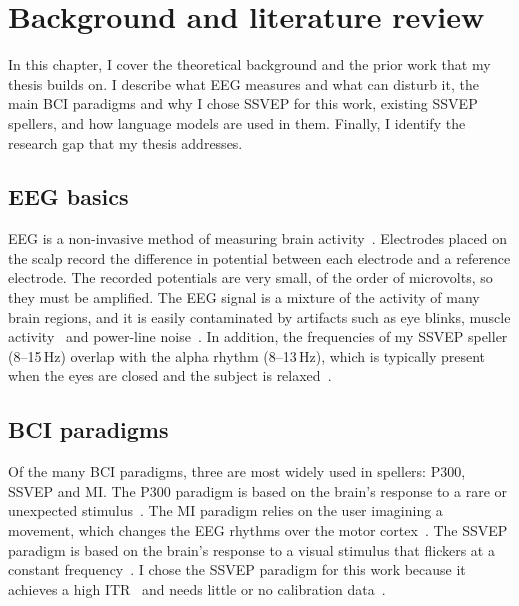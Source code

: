 
\chapter{Background and literature review}
\label{ch:background}

In this chapter, I cover the theoretical background and the prior work that my thesis
builds on. I describe what \ac{EEG} measures and what can disturb it, the main \ac{BCI}
paradigms and why I chose \ac{SSVEP} for this work, existing \ac{SSVEP} spellers, and how
language models are used in them. Finally, I identify the research gap that my thesis
addresses.

\section{EEG basics}
\label{sec:eeg}

\ac{EEG} is a non-invasive method of measuring brain activity~\citep{nunez2006electric}.
Electrodes placed on the scalp record the difference in potential between each electrode
and a reference electrode. The recorded potentials are very small, of the order of
microvolts, so they must be amplified. The \ac{EEG} signal is a mixture of the activity of
many brain regions, and it is easily contaminated by artifacts such as eye blinks, muscle
activity~\citep{goncharova2003emg} and power-line noise~\citep{wang2017benchmark}.
In addition, the frequencies of my \ac{SSVEP} speller (8--15\,Hz) overlap with the alpha
rhythm (8--13\,Hz), which is typically present when the eyes are closed and the subject is
relaxed~\citep{nunez2006electric}.

\section{BCI paradigms}
\label{sec:paradigms}

Of the many \ac{BCI} paradigms, three are most widely used in spellers: P300,
\ac{SSVEP} and \ac{MI}. The P300 paradigm is based on
the brain's response to a rare or unexpected stimulus~\citep{farwell1988talking}. The
\ac{MI} paradigm relies on the user imagining a movement, which changes the \ac{EEG}
rhythms over the motor cortex~\citep{pfurtscheller2001motor}. The \ac{SSVEP} paradigm is
based on the brain's response to a visual stimulus that flickers at a constant
frequency~\citep{chen2015fbcca}. I chose the \ac{SSVEP} paradigm for this work
because it achieves a high \ac{ITR}~\citep{chen2015highspeed,nakanishi2018trca} and needs
little or no calibration data~\citep{lin2006cca}.

